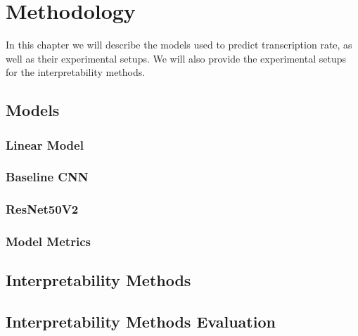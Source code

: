 \chapter{Methodology}
\label{ch:methodology}

In this chapter we will describe the models used to predict transcription rate, as well as their experimental setups. We will also provide the experimental setups for the interpretability methods.

\section{Models}
\label{sec:methodology:models}

\subsection{Linear Model}
\label{sec:methodology:lm}

\subsection{Baseline CNN}
\label{sec:methodology:BL_CNN}

\subsection{ResNet50V2}
\label{sec:methodology:RN50V2}

\subsection{Model Metrics}
\label{sec:methodology:metrics}

\section{Interpretability Methods}
\label{sec:methodology:interpretability_methods}



\section{Interpretability Methods Evaluation}
\label{sec:methodology:vgig_eval}


